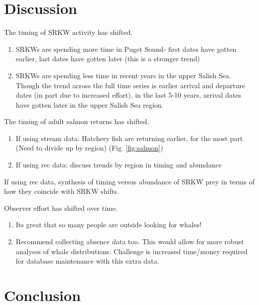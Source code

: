 \documentclass{article}
\begin{document}
\section*{Discussion}
\par The timing of SRKW activity has shifted. 
\begin{enumerate}
\item SRKWs are spending more time in Puget Sound- first dates have gotten earlier, last dates have gotten later (this is a stronger trend)
\item SRKWs are spending less time in recent years in the upper Salish Sea. Though the trend across the full time series is earlier arrival and departure dates (in part due to increased effort), in the last 5-10 years, arrival dates have gotten later in the upper Salish Sea region. 
\end{enumerate}
\par The timing of adult salmon returns has shifted. 
\begin{enumerate}
\item If using stream data: Hatchery fish are returning earlier, for the most part (Need to divide up by region) (Fig. \ref{fig:salmon})
\item If using rec data: discuss trends by region in timing and abundance
\end{enumerate}
\par If using rec data, synthesis of timing versus abundance of SRKW prey in terms of how they coincide with SRKW shifts.
\par Observer effort has shifted over time. 
\begin{enumerate}
\item Its great that so many people are outside looking for whales!
\item Recommend collecting absence data too. This would allow for more robust analyses of whale distributions. Challenge is increased time/money required for database maintenance with this extra data.
\end{enumerate}

\section*{Conclusion}
\end{document}

